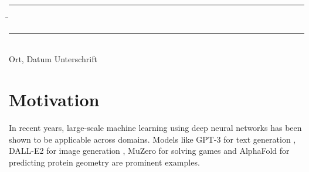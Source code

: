 \documentclass[12pt]{article}
\theoremstyle{definition}
\numberwithin{equation}{section}
\begin{document}
\vspace*{3em}

\begin{tabbing}
  \rule{.4\textwidth}{1pt} \hspace*{.2\textwidth}
  \= \rule{.4\textwidth}{1pt} \\
  Ort, Datum \> Unterschrift
\end{tabbing}

\newpage
\mbox{}
\newpage
\tableofcontents
\newpage
\listoffigures
\newpage
\printnomenclature
\newpage
\section{Motivation}
\label{sec:Motivation}
In recent years, large-scale machine learning using deep neural networks has been shown to be applicable across domains. Models like GPT-3 for text generation \autocite{brownLanguageModelsAre2020}, DALL-E2 for image generation \autocite{rameshHierarchicalTextConditionalImage2022}, MuZero for solving games \autocite{schrittwieserMasteringAtariGo2020} and AlphaFold for predicting protein geometry \autocite{jumperHighlyAccurateProtein2021} are prominent examples.
\end{document}
